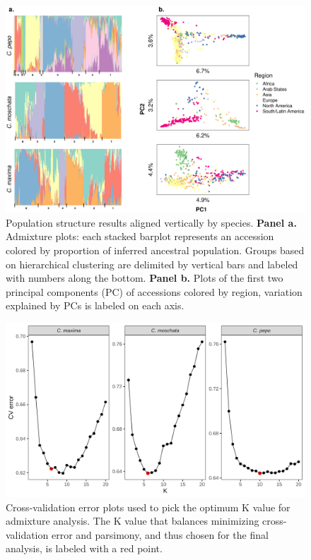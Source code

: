 \documentclass[utf8]{FrontiersinHarvard} %
\begin{document}
\clearpage

\begin{figure}[h]
	\begin{center}
		\includegraphics[width=\textwidth]{../../figures/02_fig.png}
	\end{center}
	\caption{Population structure results aligned vertically by species. \textbf{Panel a.} Admixture plots: each stacked barplot represents an accession colored by proportion of inferred ancestral population. Groups based on hierarchical clustering are delimited by vertical bars and labeled with numbers along the bottom. \textbf{Panel b.} Plots of the first two principal components (PC) of accessions colored by region, variation explained by PCs is labeled on each axis. \label{fig:3}}
\end{figure}

\clearpage

\begin{figure}[h]
	\begin{center}
		\includegraphics[width=\textwidth]{../../supplemental/02_supfig.png}
	\end{center}
	\caption{Cross-validation error plots used to pick the optimum K value for admixture analysis. The K value that balances minimizing cross-validation error and parsimony, and thus chosen for the final analysis, is labeled with a red point. \label{fig:4}}
\end{figure}
\end{document}
